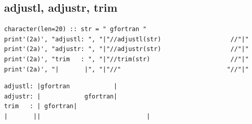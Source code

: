 \documentclass[lualatex,a4paper,12pt,report,ja=standard]{bxjsarticle}
\begin{document}
\subsection{adjustl, adjustr, trim}
\label{sec:orgc47bc9a}

\begin{verbatim}
character(len=20) :: str = " gfortran "
print'(2a)', "adjustl: ", "|"//adjustl(str)                   //"|"
print'(2a)', "adjustr: ", "|"//adjustr(str)                   //"|"
print'(2a)', "trim   : ", "|"//trim(str)                      //"|"
print'(2a)', "|       |", "|"//"                             "//"|"
\end{verbatim}

\begin{verbatim}
adjustl: |gfortran            |
adjustr: |            gfortran|
trim   : | gfortran|
|       ||                             |
\end{verbatim}
\end{document}
